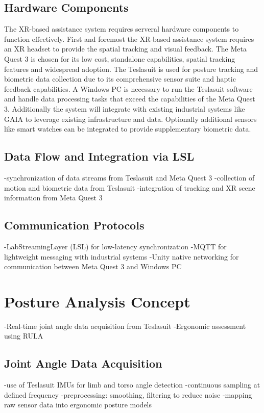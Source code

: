 \subsection{Hardware Components}
The XR-based assistance system requires serveral hardware components to function effectively. First and foremost the XR-based assistance system requires an XR headset to provide the spatial tracking and visual feedback. The Meta Quest 3 is chosen for its low cost, standalone capabilities, spatial tracking features and widespread adoption. The Teslasuit is used for posture tracking and biometric data collection due to its comprehensive sensor suite and haptic feedback capabilities. A Windows PC is necessary to run the Teslasuit software and handle data processing tasks that exceed the capabilities of the Meta Quest 3. Additionally the system will integrate with existing industrial systems like GAIA to leverage existing infrastructure and data. Optionally additional sensors like smart watches can be integrated to provide supplementary biometric data.

\subsection{Data Flow and Integration via LSL}
-synchronization of data streams from Teslasuit and Meta Quest 3 
-collection of motion and biometric data from Teslasuit
-integration of tracking and XR scene information from Meta Quest 3

\subsection{Communication Protocols}
-LabStreamingLayer (LSL) for low-latency synchronization
-MQTT for lightweight messaging with industrial systems
-Unity native networking for communication between Meta Quest 3 and Windows PC

\section{Posture Analysis Concept}
-Real-time joint angle data acquisition from Teslasuit
-Ergonomic assessment using RULA
\subsection{Joint Angle Data Acquisition}
-use of Teslasuit IMUs for limb and torso angle detection
-continuous sampling at defined frequency
-preprocessing: smoothing, filtering to reduce noise
-mapping raw sensor data into ergonomic posture models
